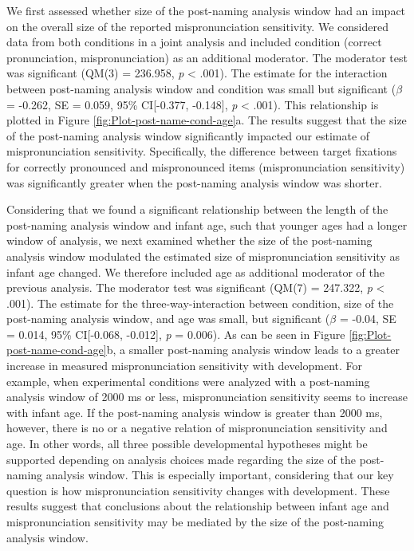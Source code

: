 \documentclass[man]{apa6}
\begin{document}
We first assessed whether size of the post-naming analysis window had an impact on the overall size of the reported mispronunciation sensitivity. We considered data from both conditions in a joint analysis and included condition (correct pronunciation, mispronunciation) as an additional moderator. The moderator test was significant (QM(3) = 236.958, \emph{p} \textless{} .001). The estimate for the interaction between post-naming analysis window and condition was small but significant (\(\beta\) = -0.262, SE = 0.059, 95\% CI{[}-0.377, -0.148{]}, \emph{p} \textless{} .001). This relationship is plotted in Figure \ref{fig:Plot-post-name-cond-age}a. The results suggest that the size of the post-naming analysis window significantly impacted our estimate of mispronunciation sensitivity. Specifically, the difference between target fixations for correctly pronounced and mispronounced items (mispronunciation sensitivity) was significantly greater when the post-naming analysis window was shorter.

Considering that we found a significant relationship between the length of the post-naming analysis window and infant age, such that younger ages had a longer window of analysis, we next examined whether the size of the post-naming analysis window modulated the estimated size of mispronunciation sensitivity as infant age changed. We therefore included age as additional moderator of the previous analysis. The moderator test was significant (QM(7) = 247.322, \emph{p} \textless{} .001). The estimate for the three-way-interaction between condition, size of the post-naming analysis window, and age was small, but significant (\(\beta\) = -0.04, SE = 0.014, 95\% CI{[}-0.068, -0.012{]}, \emph{p} = 0.006). As can be seen in Figure \ref{fig:Plot-post-name-cond-age}b, a smaller post-naming analysis window leads to a greater increase in measured mispronunciation sensitivity with development. For example, when experimental conditions were analyzed with a post-naming analysis window of 2000 ms or less, mispronunciation sensitivity seems to increase with infant age. If the post-naming analysis window is greater than 2000 ms, however, there is no or a negative relation of mispronunciation sensitivity and age. In other words, all three possible developmental hypotheses might be supported depending on analysis choices made regarding the size of the post-naming analysis window. This is especially important, considering that our key question is how mispronunciation sensitivity changes with development. These results suggest that conclusions about the relationship between infant age and mispronunciation sensitivity may be mediated by the size of the post-naming analysis window.
\end{document}
